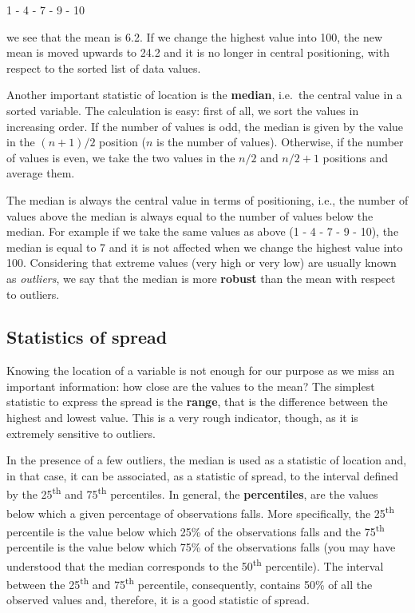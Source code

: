 \documentclass[a4paper,12pt,oneside]{book}
\begin{document}
1 - 4 - 7 - 9 - 10

we see that the mean is 6.2. If we change the highest value into 100, the new mean is moved upwards to 24.2 and it is no longer in central positioning, with respect to the sorted list of data values.

Another important statistic of location is the \textbf{median}, i.e.~the central value in a sorted variable. The calculation is easy: first of all, we sort the values in increasing order. If the number of values is odd, the median is given by the value in the \((n + 1)/2\) position (\(n\) is the number of values). Otherwise, if the number of values is even, we take the two values in the \(n/2\) and \(n/2 + 1\) positions and average them.

The median is always the central value in terms of positioning, i.e., the number of values above the median is always equal to the number of values below the median. For example if we take the same values as above (1 - 4 - 7 - 9 - 10), the median is equal to 7 and it is not affected when we change the highest value into 100. Considering that extreme values (very high or very low) are usually known as \emph{outliers}, we say that the median is more \textbf{robust} than the mean with respect to outliers.

\hypertarget{statistics-of-spread}{%
\subsection{Statistics of spread}\label{statistics-of-spread}}

Knowing the location of a variable is not enough for our purpose as we miss an important information: how close are the values to the mean? The simplest statistic to express the spread is the \textbf{range}, that is the difference between the highest and lowest value. This is a very rough indicator, though, as it is extremely sensitive to outliers.

In the presence of a few outliers, the median is used as a statistic of location and, in that case, it can be associated, as a statistic of spread, to the interval defined by the 25\textsuperscript{th} and 75\textsuperscript{th} percentiles. In general, the \textbf{percentiles}, are the values below which a given percentage of observations falls. More specifically, the 25\textsuperscript{th} percentile is the value below which 25\% of the observations falls and the 75\textsuperscript{th} percentile is the value below which 75\% of the observations falls (you may have understood that the median corresponds to the 50\textsuperscript{th} percentile). The interval between the 25\textsuperscript{th} and 75\textsuperscript{th} percentile, consequently, contains 50\% of all the observed values and, therefore, it is a good statistic of spread.
\end{document}
